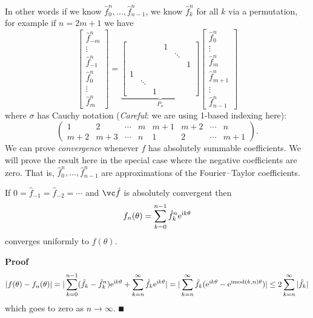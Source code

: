 In other words if we know $\hat f_0^n, \ensuremath{\ldots}, \hat f_{n-1}^n$, we know $\hat f_k^n$ for all $k$ via a permutation, for example if $n = 2m+1$ we have
\[
\begin{bmatrix}
\hat f_{-m}^n \\
\ensuremath{\vdots}\\
\hat f_{-1}^n \\
\hat f_0^n \\
\ensuremath{\vdots}\\
\hat f_m^n
\end{bmatrix} = \underbrace{\begin{bmatrix} &&& 1 \\ &&&& \ensuremath{\ddots} \\ &&&&& 1 \\
    1 \\ & \ensuremath{\ddots} \\ && 1 \end{bmatrix}}_{P_\ensuremath{\sigma}}
\begin{bmatrix}
\hat f_0^n \\
\ensuremath{\vdots}\\
\hat f_m^n\\
\hat f_{m+1}^n \\
\ensuremath{\vdots}\\
\hat f_{n-1}^n
\end{bmatrix}
\]
where $\ensuremath{\sigma}$ has Cauchy notation (\emph{Careful}: we are using 1-based indexing here):
\[
\begin{pmatrix}
1 & 2 & \ensuremath{\cdots} & m & m+1 & m+2 & \ensuremath{\cdots} & n  \\
m+2 & m+3 & \ensuremath{\cdots} & n & 1 & 2 & \ensuremath{\cdots} & m+1
\end{pmatrix}.
\]
We can  prove \emph{convergence} whenever $f$ has absolutely summable coefficients. We will prove the result here in the special case where the negative coefficients are zero. That is, $\hat f_0^n, \ensuremath{\ldots}, \hat f_{n-1}^n$ are approximations of the Fourier\ensuremath{\endash}Taylor coefficients.

\begin{theorem} If $0 = \hat f_{-1} = \hat f_{-2} = \ensuremath{\cdots}$ and $\vchatf$ is absolutely convergent then
\[
f_n(\ensuremath{\theta}) = \ensuremath{\sum}_{k=0}^{n-1} \hat f_k^n {\rm e}^{{\rm i} k \ensuremath{\theta}}
\]
converges uniformly to $f(\ensuremath{\theta})$.

\end{theorem}
\textbf{Proof}
\begin{align*}
|f(\ensuremath{\theta}) - f_n(\ensuremath{\theta})| = |\ensuremath{\sum}_{k=0}^{n-1} (\hat f_k - \hat f_k^n) {\rm e}^{{\rm i} k \ensuremath{\theta}} + \ensuremath{\sum}_{k=n}^\ensuremath{\infty} \hat f_k {\rm e}^{{\rm i} k \ensuremath{\theta}}|
= |\ensuremath{\sum}_{k=n}^\ensuremath{\infty} \hat f_k ({\rm e}^{{\rm i} k \ensuremath{\theta}} - {\rm e}^{{\rm i} {\rm mod}(k,n) \ensuremath{\theta}})|
\ensuremath{\leq} 2 \ensuremath{\sum}_{k=n}^\ensuremath{\infty} |\hat f_k|
\end{align*}
which goes to zero as $n \ensuremath{\rightarrow} \ensuremath{\infty}$. \ensuremath{\QED}

